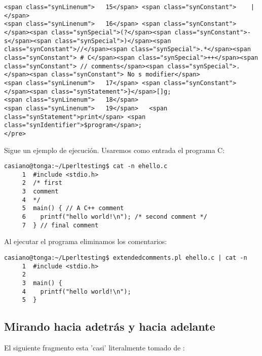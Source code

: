 \begin{verbatim}
<span class="synLinenum">   15</span> <span class="synConstant">    |</span>
<span class="synLinenum">   16</span> <span class="synConstant">      </span><span class="synSpecial">(?</span><span class="synConstant">-s</span><span class="synSpecial">)</span><span class="synConstant">//</span><span class="synSpecial">.*</span><span class="synConstant"> # C</span><span class="synSpecial">++</span><span class="synConstant"> // comments</span><span class="synSpecial">.</span><span class="synConstant"> No s modifier</span>
<span class="synLinenum">   17</span> <span class="synConstant">  </span><span class="synStatement">}</span>[]g;
<span class="synLinenum">   18</span> 
<span class="synLinenum">   19</span>   <span class="synStatement">print</span> <span class="synIdentifier">$program</span>;
</pre>

\end{verbatim}
Sigue un ejemplo de ejecución. Usaremos como entrada el programa C:
\begin{verbatim}
casiano@tonga:~/Lperltesting$ cat -n ehello.c
     1  #include <stdio.h>
     2  /* first
     3  comment
     4  */
     5  main() { // A C++ comment
     6    printf("hello world!\n"); /* second comment */
     7  } // final comment
\end{verbatim}
Al ejecutar el programa eliminamos los comentarios:
\begin{verbatim}
casiano@tonga:~/Lperltesting$ extendedcomments.pl ehello.c | cat -n
     1  #include <stdio.h>
     2
     3  main() {
     4    printf("hello world!\n");
     5  }

\end{verbatim}


\subsection{Mirando hacia adetrás y hacia adelante}
\label{subsection:lookaheadlookbehind}

El siguiente fragmento esta 'casi' literalmente tomado
de :

